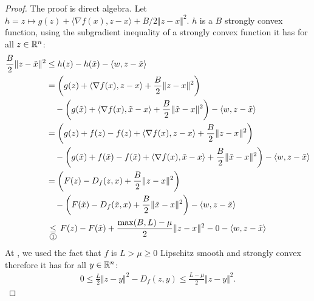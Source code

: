 \documentclass[12pt]{article}
\begin{document}
        \begin{proof}
            The proof is direct algebra. 
            Let $h = z \mapsto g(z) + \langle \nabla f(x), z - x\rangle + B/2\Vert z - x\Vert^2$. 
            $h$ is a $B$ strongly convex function, using the subgradient inequality of a strongly convex function it has for all $z \in \mathbb R^n$: 
            \begin{align*}
                \frac{B}{2}\Vert z - \tilde x\Vert^2
                &\le h(z) - h(\tilde x) - \langle w, z - \tilde x\rangle
                \\
                &= 
                \left(
                    g(z) + \langle \nabla f(x), z - x\rangle + \frac{B}{2}\Vert z - x\Vert^2
                \right)
                \\ &\quad 
                    - 
                    \left(
                        g(\tilde x) + \langle \nabla f(x), \tilde x - x\rangle + \frac{B}{2}\Vert \tilde x - x\Vert^2
                    \right)
                    - \langle w, z - \tilde x\rangle
                \\
                &= \left(
                    g(z) + f(z) - f(z) + \langle \nabla f(x), z - x\rangle + \frac{B}{2}\Vert z - x\Vert^2
                \right)
                \\ &\quad 
                    - 
                    \left(
                        g(\tilde x) + f(\tilde x) - f(\tilde x) 
                        + \langle \nabla f(x), \tilde x - x\rangle + \frac{B}{2}\Vert \tilde x - x\Vert^2
                    \right)
                    - \langle w, z - \tilde x\rangle
                \\
                &= \left(
                    F(z) - D_f(z, x) + \frac{B}{2}\Vert z - x\Vert^2
                \right)
                \\ &\quad 
                    - 
                    \left(
                        F(\tilde x) - D_f(\tilde x, x) + \frac{B}{2}\Vert \tilde x - x\Vert^2
                    \right)
                    - \langle w, z - \tilde x\rangle
                \\
                &\underset{\text{\circled{1}}}{\le} F(z) - F(\tilde x) + \frac{\max(B, L) - \mu}{2}\Vert z - x\Vert^2 - 0 - \langle w, z - \tilde x \rangle
            \end{align*}
            At , we used the fact that $f$ is $L > \mu \ge 0$ Lipschitz smooth and strongly convex therefore it has for all $y \in \mathbb R^n$: 
            \begin{align*}
                0 
                \le \frac{L}{2}\Vert z - y\Vert^2  - D_f(z, y)
                \le \frac{L - \mu}{2}\Vert z - y\Vert^2. 
            \end{align*}
        \end{proof}
\end{document}
